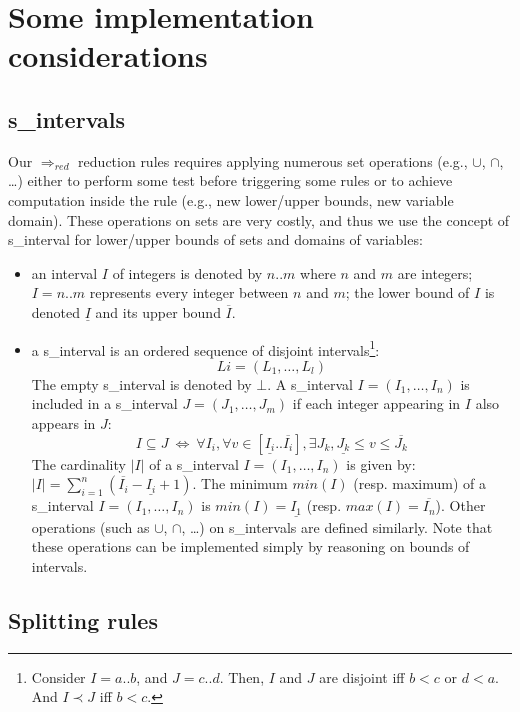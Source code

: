 \documentclass[3p,authoryear,times]{elsarticle}
\newcommand{\card}[1]{|#1|}
\newcommand{\rmin}[0]{{\Rightarrow_{red}}}
\begin{document}
\section{Some implementation considerations}
\label{sec:implentation}


\subsection{s\_intervals}

Our $\rmin$ reduction rules requires applying numerous set operations (e.g., $\cup$, $\cap$, \ldots) either to perform some 
test before triggering some rules or to achieve computation inside the rule (e.g., new lower/upper bounds, new variable domain). These operations on sets are very costly, and thus we use the concept of s\_interval for lower/upper bounds of sets and domains of variables:
\begin{itemize}
\item an interval $I$ of integers is denoted by $n..m$ where $n$ and $m$ are integers; $I=n..m$ represents every integer between $n$ and $m$; the lower bound of $I$ is denoted $\underline{I}$ and its upper bound $\overline{I}$.
\item a s\_interval is an ordered sequence of disjoint intervals\footnote{Consider $I=a..b$, and $J=c..d$. Then, 
$I$ and $J$ are disjoint iff $b<c$ or $d<a$. And $I \prec J$ iff $b<c$.
}: 
\[ Li=(L_1, \ldots, L_l)\]
The empty s\_interval is denoted by $\bot$. A s\_interval $I=(I_1, \ldots, I_n)$ is included in a s\_interval $J=(J_1, \ldots, J_m)$ if each integer appearing in $I$ also appears in $J$:
\[
I \subseteq J ~\Leftrightarrow~ \forall I_i, \forall v \in [\underline{I_i}..\overline{I_i}], \exists J_k, \underline{J_k} \leq v \leq \overline{J_k}
\]
The cardinality $\card{I}$ of a s\_interval $I=(I_1, \ldots, I_n)$ is given by: $\card{I} = \sum_{i=1}^{n} (\overline{I_i} - \underline{I_i}+1)$. The minimum $min(I)$ (resp. maximum) of a s\_interval $I=(I_1, \ldots, I_n)$ is $min(I)=\underline{I_1}$ (resp. $max(I)=\overline{I_n}$).
%
Other operations (such as $\cup$, $\cap$, \ldots) on s\_intervals are defined similarly. Note that these operations can be implemented simply by reasoning on bounds of intervals.

\end{itemize}

\subsection{Splitting rules}
\end{document}
